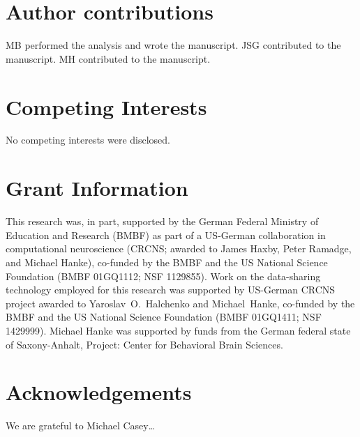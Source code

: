 

\section*{Author contributions}

MB performed the analysis and wrote the manuscript.
JSG contributed to the manuscript.
MH contributed to the manuscript.


\section*{Competing Interests}
No competing interests were disclosed.

\section*{Grant Information}

This research was, in part, supported by the German Federal Ministry of
Education and Research (BMBF) as part of a US-German collaboration in
computational neuroscience (CRCNS; awarded to James Haxby, Peter Ramadge, and
Michael Hanke), co-funded by the BMBF and the US National Science Foundation
(BMBF 01GQ1112; NSF 1129855).  Work on the data-sharing technology employed for
this research was supported by US-German CRCNS project awarded to
Yaroslav~O.~Halchenko and Michael~Hanke, co-funded by the BMBF and the US
National Science Foundation (BMBF 01GQ1411; NSF 1429999).  Michael Hanke was
supported by funds from the German federal state of Saxony-Anhalt, Project:
Center for Behavioral Brain Sciences.


\section*{Acknowledgements}

We are grateful to Michael Casey\ldots





